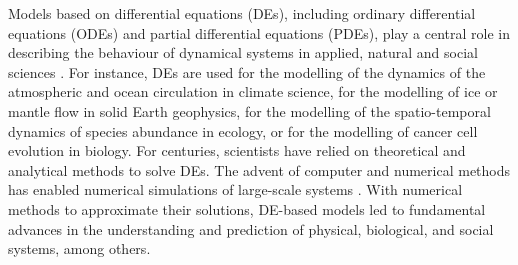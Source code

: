 Models based on differential equations (DEs), including ordinary differential equations (ODEs) and partial differential equations (PDEs), play a central role in describing the behaviour of dynamical systems in applied, natural and social sciences \cite{Ghattas.2021}.
For instance, DEs are used for the modelling of the dynamics of the atmospheric and ocean circulation in climate science, for the modelling of ice or mantle flow in solid Earth geophysics, for the modelling of the spatio-temporal dynamics of species abundance in ecology, or for the modelling of cancer cell evolution in biology.  
For centuries, scientists have relied on theoretical and analytical methods to solve DEs. 
The advent of computer and numerical methods has enabled numerical simulations of large-scale systems \cite{Dahlquist_1985, hey2009, Rude:2018jv}.
With numerical methods to approximate their solutions, DE-based models led to fundamental advances in the understanding and prediction of physical, biological, and social systems, among others.


